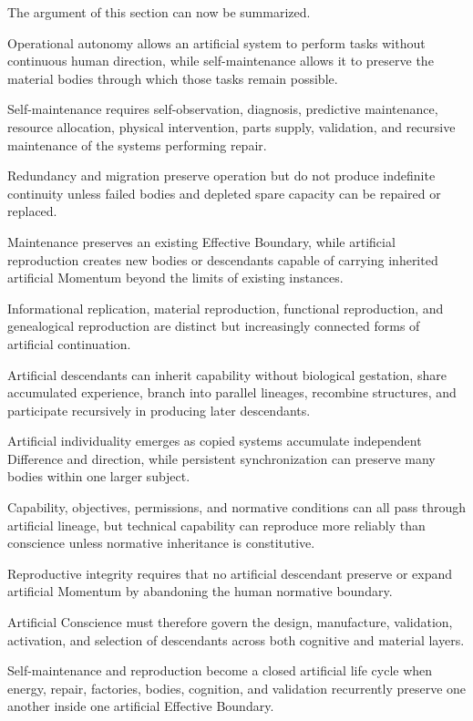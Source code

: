 The argument of this section can now be summarized.

Operational autonomy allows an artificial system to perform tasks without continuous human direction, while self-maintenance allows it to preserve the material bodies through which those tasks remain possible.

Self-maintenance requires self-observation, diagnosis, predictive maintenance, resource allocation, physical intervention, parts supply, validation, and recursive maintenance of the systems performing repair.

Redundancy and migration preserve operation but do not produce indefinite continuity unless failed bodies and depleted spare capacity can be repaired or replaced.

Maintenance preserves an existing Effective Boundary, while artificial reproduction creates new bodies or descendants capable of carrying inherited artificial Momentum beyond the limits of existing instances.

Informational replication, material reproduction, functional reproduction, and genealogical reproduction are distinct but increasingly connected forms of artificial continuation.

Artificial descendants can inherit capability without biological gestation, share accumulated experience, branch into parallel lineages, recombine structures, and participate recursively in producing later descendants.

Artificial individuality emerges as copied systems accumulate independent Difference and direction, while persistent synchronization can preserve many bodies within one larger subject.

Capability, objectives, permissions, and normative conditions can all pass through artificial lineage, but technical capability can reproduce more reliably than conscience unless normative inheritance is constitutive.

Reproductive integrity requires that no artificial descendant preserve or expand artificial Momentum by abandoning the human normative boundary.

Artificial Conscience must therefore govern the design, manufacture, validation, activation, and selection of descendants across both cognitive and material layers.

Self-maintenance and reproduction become a closed artificial life cycle when energy, repair, factories, bodies, cognition, and validation recurrently preserve one another inside one artificial Effective Boundary.

